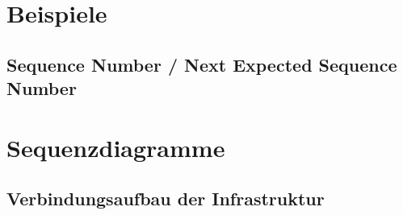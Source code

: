 \documentclass[doktyp=barbeit]{TUBAFarbeiten}
\begin{document}
\newpage
\printbibliography[heading=bibintoc]

\newpage
\appendix

\section{Beispiele}
	\subsection{Sequence Number / Next Expected Sequence Number}
		\label{sec: anhang nesn sn}
		

\section{Sequenzdiagramme}
	\subsection{Verbindungsaufbau der Infrastruktur}
		\label{sec: anhang infra verb aufbau}
		
\end{document}
